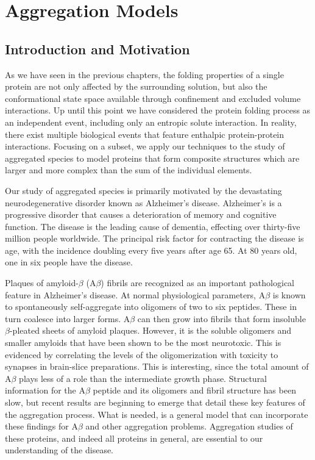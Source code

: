 \chapter{Aggregation Models}
\label{chap:potts_aggregation}

\section{Introduction and Motivation}
As we have seen in the previous chapters, the folding properties of a single protein are not only affected by the surrounding solution, but also the conformational state space available through confinement and excluded volume interactions. Up until this point we have considered the protein folding process as an independent event, including only an entropic solute interaction. In reality, there exist multiple biological events that feature enthalpic protein-protein interactions. Focusing on a subset, we apply our techniques to the study of aggregated species to model proteins that form composite structures which are larger and more complex than the sum of the individual elements.

Our study of aggregated species is primarily motivated by the devastating neurodegenerative disorder known as Alzheimer's disease. Alzheimer's is a progressive disorder that causes a deterioration of memory and cognitive function. The disease is the leading cause of dementia,\cite{querfurth_alzheimers_2010} effecting over thirty-five million people worldwide. The principal risk factor for contracting the disease is age, with the incidence doubling every five years after age 65. At 80 years old, one in six people have the disease.

Plaques of amyloid-$\beta$ (A$\beta$) fibrils are recognized as an important pathological feature in Alzheimer's disease. At normal physiological parameters, A$\beta$  is known to spontaneously self-aggregate into oligomers of two to six peptides. These in turn coalesce into larger forms. A$\beta$ can then grow into fibrils that form insoluble $\beta$-pleated sheets of amyloid plaques. However, it is the soluble oligomers and smaller amyloids that have been shown to be the most neurotoxic. This is evidenced by correlating the levels of the oligomerization with toxicity to synapses in brain-slice preparations.\cite{walsh_certain_2005} This is interesting, since the total amount of A$\beta$ plays less of a role than the intermediate growth phase.\cite{lue_soluble_1999} Structural information for the A$\beta$ peptide and its oligomers and fibril structure has been slow,\cite{kajava_beta-structures_2006} but recent results are beginning to emerge that detail these key features of the aggregation process.\cite{streltsov_crystal_2011} What is needed, is a general model that can incorporate these findings for A$\beta$ and other aggregation problems.  Aggregation studies of these proteins, and indeed all proteins in general, are essential to our understanding of the disease.

